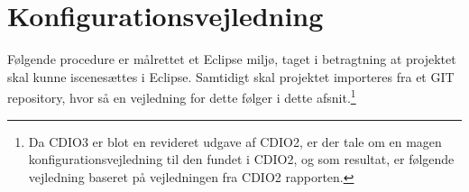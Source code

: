 




\newpage
\section{Konfigurationsvejledning}
Følgende procedure er målrettet et Eclipse miljø, taget i betragtning at projektet skal kunne iscenesættes i Eclipse. Samtidigt skal projektet importeres fra et GIT repository, hvor så en vejledning for dette følger i dette afsnit.\footnote{ Da CDIO3 er blot en revideret udgave af CDIO2, er der tale om en magen konfigurationsvejledning til den fundet i CDIO2, og som resultat, er følgende vejledning baseret på vejledningen fra CDIO2 rapporten.}\\

